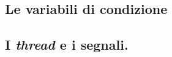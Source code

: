 \subsection{Le variabili di condizione}
\label{sec:pthread_cond}




\subsection{I \textit{thread} e i segnali.}
\label{sec:thread_signal}











